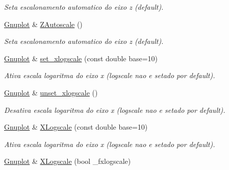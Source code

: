 \begin{DoxyCompactItemize}
\begin{DoxyCompactList}\small\item\em Seta escalonamento automatico do eixo z (default). \end{DoxyCompactList}\item 
\hypertarget{classGnuplot_ac926d0513fa38b316be4c6acfc65ca80}{\hyperlink{classGnuplot}{Gnuplot} \& \hyperlink{classGnuplot_ac926d0513fa38b316be4c6acfc65ca80}{Z\-Autoscale} ()}\label{classGnuplot_ac926d0513fa38b316be4c6acfc65ca80}

\begin{DoxyCompactList}\small\item\em Seta escalonamento automatico do eixo z (default). \end{DoxyCompactList}\item 
\hypertarget{classGnuplot_aff546fad227d93babeb5d2cc9f047b89}{\hyperlink{classGnuplot}{Gnuplot} \& \hyperlink{classGnuplot_aff546fad227d93babeb5d2cc9f047b89}{set\-\_\-xlogscale} (const double base=10)}\label{classGnuplot_aff546fad227d93babeb5d2cc9f047b89}

\begin{DoxyCompactList}\small\item\em Ativa escala logaritma do eixo x (logscale nao e setado por default). \end{DoxyCompactList}\item 
\hypertarget{classGnuplot_aed8f962539fd8f53ab2c0218da7a6010}{\hyperlink{classGnuplot}{Gnuplot} \& \hyperlink{classGnuplot_aed8f962539fd8f53ab2c0218da7a6010}{unset\-\_\-xlogscale} ()}\label{classGnuplot_aed8f962539fd8f53ab2c0218da7a6010}

\begin{DoxyCompactList}\small\item\em Desativa escala logaritma do eixo x (logscale nao e setado por default). \end{DoxyCompactList}\item 
\hypertarget{classGnuplot_a16763e22005b72ebe62c09653b2dc8fa}{\hyperlink{classGnuplot}{Gnuplot} \& \hyperlink{classGnuplot_a16763e22005b72ebe62c09653b2dc8fa}{X\-Logscale} (const double base=10)}\label{classGnuplot_a16763e22005b72ebe62c09653b2dc8fa}

\begin{DoxyCompactList}\small\item\em Ativa escala logaritma do eixo x (logscale nao e setado por default). \end{DoxyCompactList}\item 
\hypertarget{classGnuplot_abf7948557e91cb8c6eb6b641e1b55543}{\hyperlink{classGnuplot}{Gnuplot} \& \hyperlink{classGnuplot_abf7948557e91cb8c6eb6b641e1b55543}{X\-Logscale} (bool \-\_\-fxlogscale)}\label{classGnuplot_abf7948557e91cb8c6eb6b641e1b55543}


\end{DoxyCompactItemize}
